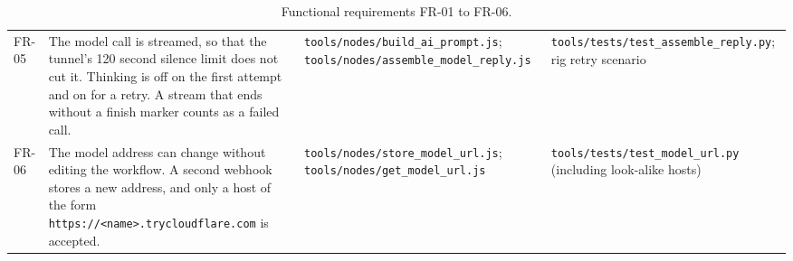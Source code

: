 \begin{table}[!htbp]
\begin{tabularx}{\linewidth}{>{\raggedright\arraybackslash}p{1.2cm}>{\raggedright\arraybackslash}X>{\raggedright\arraybackslash}X>{\raggedright\arraybackslash}X}
FR-05 & The model call is streamed, so that the tunnel's 120 second silence limit does not cut it. Thinking is off on the first attempt and on for a retry. A stream that ends without a finish marker counts as a failed call. & \texttt{tools/\allowbreak{}nodes/\allowbreak{}build\_\allowbreak{}ai\_\allowbreak{}prompt.js}; \texttt{tools/\allowbreak{}nodes/\allowbreak{}assemble\_\allowbreak{}model\_\allowbreak{}reply.js} & \texttt{tools/\allowbreak{}tests/\allowbreak{}test\_\allowbreak{}assemble\_\allowbreak{}reply.py}; rig retry scenario \\
FR-06 & The model address can change without editing the workflow. A second webhook stores a new address, and only a host of the form \texttt{https://\allowbreak{}<name>.\allowbreak{}trycloudflare.\allowbreak{}com} is accepted. & \texttt{tools/\allowbreak{}nodes/\allowbreak{}store\_\allowbreak{}model\_\allowbreak{}url.js}; \texttt{tools/\allowbreak{}nodes/\allowbreak{}get\_\allowbreak{}model\_\allowbreak{}url.js} & \texttt{tools/\allowbreak{}tests/\allowbreak{}test\_\allowbreak{}model\_\allowbreak{}url.py} (including look-alike hosts) \\
\bottomrule
\end{tabularx}
\caption{Functional requirements FR-01 to FR-06.}
\label{tab:fr1}
\end{table}

